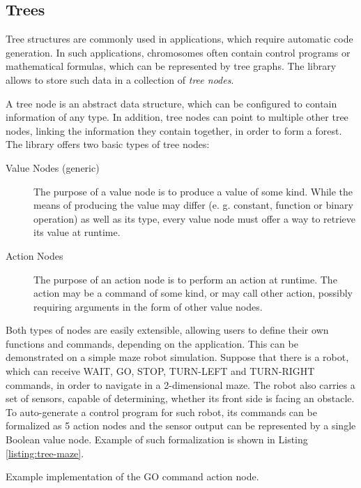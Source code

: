 \subsection{Trees}
Tree structures are commonly used in applications, which require automatic code generation. In such applications, chromosomes often contain control programs or mathematical formulas, which can be represented by tree graphs. The library allows to store such data in a collection of \textit{tree nodes}.

A tree node is an abstract data structure, which can be configured to contain information of any type. In addition, tree nodes can point to multiple other tree nodes, linking the information they contain together, in order to form a forest. The library offers two basic types of tree nodes:
~
\begin{description}
	\item[Value Nodes (generic)]
	The purpose of a value node is to produce a value of some kind. While the means of producing the value may differ (e. g. constant, function or binary operation) as well as its type, every value node must offer a way to retrieve its value at runtime.

	\item[Action Nodes]
	The purpose of an action node is to perform an action at runtime. The action may be a command of some kind, or may call other action, possibly requiring arguments in the form of other value nodes.
\end{description}

Both types of nodes are easily extensible, allowing users to define their own functions and commands, depending on the application. This can be demonstrated on a simple maze robot simulation. Suppose that there is a robot, which can receive WAIT, GO, STOP, TURN-LEFT and TURN-RIGHT commands, in order to navigate in a 2-dimensional maze. The robot also carries a set of sensors, capable of determining, whether its front side is facing an obstacle. To auto-generate a control program for such robot, its commands can be formalized as 5 action nodes and the sensor output can be represented by a single Boolean value node. Example of such formalization is shown in Listing \ref{listing:tree-maze}.

\begin{listing}[ht]
	\caption{Example implementation of the GO command action node.}
	\label{listing:tree-maze}
\end{listing}

